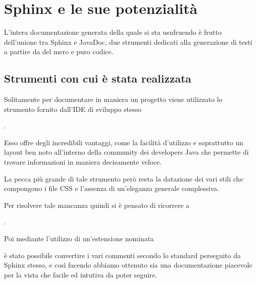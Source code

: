 \documentclass[letterpaper,10pt,italian,openany,oneside]{sphinxmanual}
\begin{document}
\chapter{Sphinx e le sue potenzialità}
\label{\detokenize{sphinx:sphinx-e-le-sue-potenzialita}}\label{\detokenize{sphinx::doc}}
L’intera documentazione generata della quale si sta usufruendo è frutto dell’unione tra Sphinx e JavaDoc, due strumenti
dedicati alla generazione di testi a partire da del mero e puro codice.


\section{Strumenti con cui è stata realizzata}
\label{\detokenize{sphinx:strumenti-con-cui-e-stata-realizzata}}
Solitamente per documentare in maniera  un progetto  viene utilizzato
lo strumento fornito dall’IDE di sviluppo stesso  %
\begin{footnote}[1]\sphinxAtStartFootnote
{}
%
\end{footnote}.

Esso offre degli incredibili vantaggi, come la facilità d’utilizzo e soprattutto un
layout ben noto all’interno della community dei developers Java che permette
di trovare informazioni in maniera decisamente veloce.

La pecca più grande di tale strumento però resta la datazione dei vari stili che compongono
i file CSS e l’assenza di un’eleganza generale complessiva.

Per risolvere tale mancanza quindi si è pensato di ricorrere a  %
\begin{footnote}[2]\sphinxAtStartFootnote
{}
%
\end{footnote}.

Poi mediante l’utilizzo di un’estensione nominata  %
\begin{footnote}[3]\sphinxAtStartFootnote
{}
%
\end{footnote} è stato possibile
convertire i vari commenti  secondo lo standard perseguito da Sphinx stesso, e così
facendo abbiamo ottenuto sia una documentazione piacevole per la vista che
facile ed intutiva da poter seguire.
\end{document}
